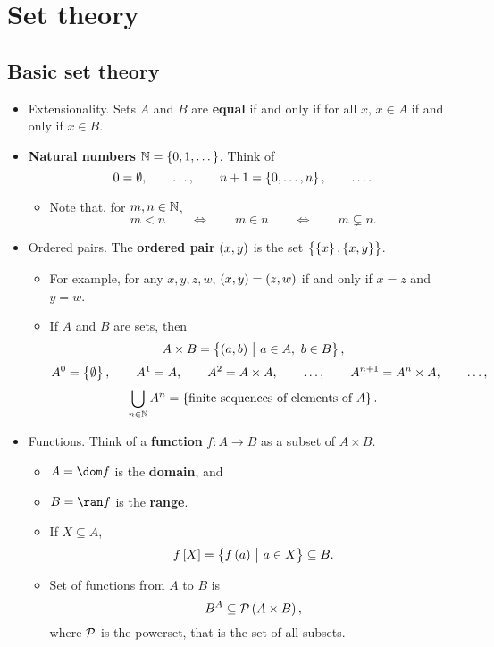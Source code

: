 \section{Set theory}

\setcounter{subsection}{-1}

\subsection{Basic set theory}

\begin{itemize}
\item Extensionality. Sets $ A $ and $ B $ are \textbf{equal} if and only if for all $ x $, $ x \in A $ if and only if $ x \in B $.
\item \textbf{Natural numbers} $ \NN = \cbr{0, 1, \dots} $. Think of
$$ 0 = \emptyset, \qquad \dots, \qquad n + 1 = \cbr{0, \dots, n}, \qquad \dots. $$
\begin{itemize}
\item Note that, for $ m, n \in \mathbb{N} $,
$$ m < n \qquad \iff \qquad m \in n \qquad \iff \qquad m \subsetneq n. $$
\end{itemize}
\item Ordered pairs. The \textbf{ordered pair} $ \br{x, y} $ is the set $ \cbr{\cbr{x}, \cbr{x, y}} $.
\begin{itemize}
\item For example, for any $ x, y, z, w $, $ \br{x, y} = \br{z, w} $ if and only if $ x = z $ and $ y = w $.
\item If $ A $ and $ B $ are sets, then
$$ A \times B = \cbr{\br{a, b} \st a \in A, \ b \in B}, $$
$$ A^0 = \cbr{\emptyset}, \qquad A^1 = A, \qquad A^2 = A \times A, \qquad \dots, \qquad A^{n + 1} = A^n \times A, \qquad \dots, $$
$$ \bigcup_{n \in \NN} A^n = \cbr{\text{finite sequences of elements of} \ A}. $$
\end{itemize}
\item Functions. Think of a \textbf{function} $ f : A \to B $ as a subset of $ A \times B $.
\begin{itemize}
\item $ A = \dom f $ is the \textbf{domain}, and
\item $ B = \ran f $ is the \textbf{range}.
\item If $ X \subseteq A $,
$$ f\sbr{X} = \cbr{f\br{a} \st a \in X} \subseteq B. $$
\item Set of functions from $ A $ to $ B $ is
$$ B^A \subseteq \PPP\br{A \times B}, $$
where $ \mathcal{P} $ is the powerset, that is the set of all subsets.
\end{itemize}
\end{itemize}

